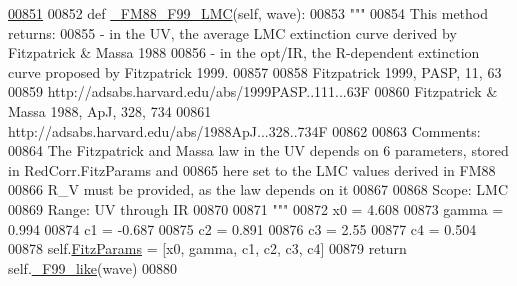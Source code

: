 \begin{DoxyVerb}
\begin{DoxyCode}
\hypertarget{classpyneb_1_1extinction_1_1red__corr_1_1_red_corr_l00851}{}\hyperlink{classpyneb_1_1extinction_1_1red__corr_1_1_red_corr_aae30a2150d566f04044db33a1612be8b}{00851} 
00852     \textcolor{keyword}{def }\hyperlink{classpyneb_1_1extinction_1_1red__corr_1_1_red_corr_aae30a2150d566f04044db33a1612be8b}{\_FM88\_F99\_LMC}(self, wave):
00853         \textcolor{stringliteral}{"""}
00854 \textcolor{stringliteral}{        This method returns:}
00855 \textcolor{stringliteral}{        - in the UV, the average LMC extinction curve derived by Fitzpatrick & Massa 1988}
00856 \textcolor{stringliteral}{        - in the opt/IR, the R-dependent extinction curve proposed by Fitzpatrick 1999.}
00857 \textcolor{stringliteral}{        }
00858 \textcolor{stringliteral}{        Fitzpatrick 1999, PASP, 11, 63}
00859 \textcolor{stringliteral}{        http://adsabs.harvard.edu/abs/1999PASP..111...63F}
00860 \textcolor{stringliteral}{        Fitzpatrick & Massa 1988, ApJ, 328, 734}
00861 \textcolor{stringliteral}{        http://adsabs.harvard.edu/abs/1988ApJ...328..734F}
00862 \textcolor{stringliteral}{        }
00863 \textcolor{stringliteral}{        Comments:}
00864 \textcolor{stringliteral}{        The Fitzpatrick and Massa law in the UV depends on 6 parameters, stored in RedCorr.FitzParams and }
00865 \textcolor{stringliteral}{        here set to the LMC values derived in FM88}
00866 \textcolor{stringliteral}{        R\_V must be provided, as the law depends on it}
00867 \textcolor{stringliteral}{        }
00868 \textcolor{stringliteral}{        Scope: LMC}
00869 \textcolor{stringliteral}{        Range: UV through IR}
00870 \textcolor{stringliteral}{}
00871 \textcolor{stringliteral}{        """}
00872         x0 = 4.608
00873         gamma = 0.994
00874         c1 = -0.687
00875         c2 = 0.891
00876         c3 = 2.55
00877         c4 = 0.504  
00878         self.\hyperlink{classpyneb_1_1extinction_1_1red__corr_1_1_red_corr_a133fcc7513d358e629266b24cbe7bebc}{FitzParams} = [x0, gamma, c1, c2, c3, c4]
00879         \textcolor{keywordflow}{return} self.\hyperlink{classpyneb_1_1extinction_1_1red__corr_1_1_red_corr_a8eb0fe7f840c32a87adfcf7ddd98a095}{\_F99\_like}(wave)
00880     
    
\end{DoxyCode}
\hypertarget{classpyneb_1_1extinction_1_1red__corr_1_1_red_corr_a5e121988480c19aeb1fa5747b5d8d3a7}{
}
\end{DoxyVerb}
